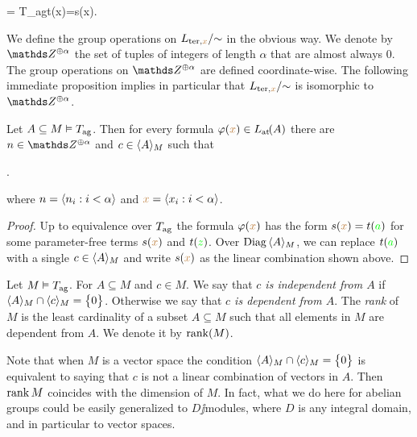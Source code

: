 \documentclass[creche.tex]{subfiles}
\begin{document}
%
{=}%
{T_{\rm ag}\proves t({\mr x})=s({\mr x}).}

We define the group operations on $L_{{\rm ter},{\mr x}}/\mathord{\sim}$ in the obvious way. We denote by $\ZZ^{\oplus\alpha}$ the set of tuples of integers of length $\alpha$ that are almost always $0$. The group operations on $\ZZ^{\oplus\alpha}$ are defined coordinate-wise. The following immediate proposition implies in particular that  $L_{{\rm ter},{\mr x}}/\mathord{\sim}$ is isomorphic to $\ZZ^{\oplus\alpha}$.

\begin{proposition}
\label{corol_formacanonicaterminimoduli}
Let $A\subseteq M\models T_{\rm ag}$. Then for every formula $\phi({\mr x})\in\atL(A)$ there are $n\in\ZZ^{\oplus\alpha}$ and $c\in\<A\>_M$ such that 

.

where $n=\<n_i:i<\alpha\>$ and  ${\mr x}=\<x_i:i<\alpha\>$.\QED

\end{proposition}

\begin{proof}
Up to equivalence over $T_{\rm ag}$ the formula $\phi({\mr x})$ has the form $s({\mr x})=t({\gr a})$ for some parameter-free terms $s({\mr x})$ and $t({\gr z})$. Over $\Diag\,\<A\>_M$, we can replace $t({\gr a})$ with a single  $c\in \<A\>_M$ and write $s({\mr x})$ as the linear combination shown above.
\end{proof}


\begin{definition} Let $M\models T_{\rm ag}$. For $A\subseteq M$ and  $c\in M$. We say that  \emph{$c$ is independent from $A$\/} if $\<A\>_M\cap\<c\>_M=\big\{0\big\}$. Otherwise we say that \emph{$c$ is dependent from $A$}. The \emph{rank\/} of $M$ is the least cardinality of a subset $A\subseteq M$ such that all elements in $M$ are dependent from $A$. We denote it by \emph{$\rank(M)$}.\QED
\end{definition}  

Note that when $M$ is a vector space the condition $\<A\>_M\cap\<c\>_M=\big\{0\big\}$ is equivalent to saying that $c$ is not a linear combination of vectors in $A$. Then $\rank M$ coincides with the dimension of $M$. In fact, what we do here for abelian groups could be easily generalized to $D\jj$modules, where $D$ is any integral domain, and in particular to vector spaces.
\end{document}
